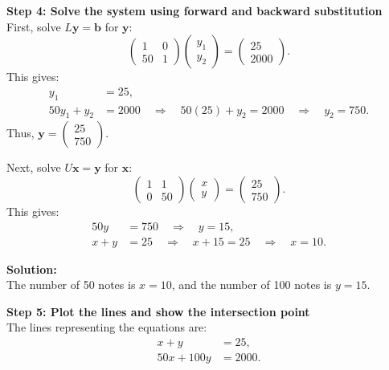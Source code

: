 \documentclass[journal]{IEEEtran}
\begin{document}
	\textbf{Step 4: Solve the system using forward and backward substitution}\\
	First, solve \(L \mathbf{y} = \mathbf{b}\) for \(\mathbf{y}\):
	\[
	\begin{pmatrix} 1 & 0 \\ 50 & 1 \end{pmatrix} \begin{pmatrix} y_1 \\ y_2 \end{pmatrix} = \begin{pmatrix} 25 \\ 2000 \end{pmatrix}.
	\]
	This gives:
	\begin{align}
		y_1 &= 25, \\
		50y_1 + y_2 &= 2000 \quad \Rightarrow \quad 50(25) + y_2 = 2000 \quad \Rightarrow \quad y_2 = 750.
	\end{align}
	Thus, \(\mathbf{y} = \begin{pmatrix} 25 \\ 750 \end{pmatrix}\).
	
	Next, solve \(U \mathbf{x} = \mathbf{y}\) for \(\mathbf{x}\):
	\[
	\begin{pmatrix} 1 & 1 \\ 0 & 50 \end{pmatrix} \begin{pmatrix} x \\ y \end{pmatrix} = \begin{pmatrix} 25 \\ 750 \end{pmatrix}.
	\]
	This gives:
	\begin{align}
		50y &= 750 \quad \Rightarrow \quad y = 15, \\
		x + y &= 25 \quad \Rightarrow \quad x + 15 = 25 \quad \Rightarrow \quad x = 10.
	\end{align}
	
	\textbf{Solution:}\\
	The number of 50 notes is \(x = 10\), and the number of 100 notes is \(y = 15\).
	
	\textbf{Step 5: Plot the lines and show the intersection point}\\
	The lines representing the equations are:
	\begin{align}
		x + y &= 25, \\
		50x + 100y &= 2000.
	\end{align}
	
\end{document}

